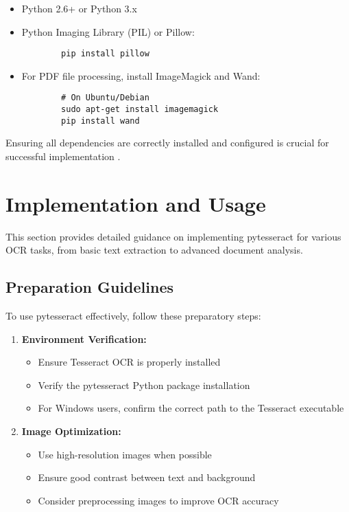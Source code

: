 \begin{itemize}
	\item Python 2.6+ or Python 3.x
	\item Python Imaging Library (PIL) or Pillow:
	\begin{verbatim}
		pip install pillow
	\end{verbatim}
	\item For PDF file processing, install ImageMagick and Wand:
	\begin{verbatim}
		# On Ubuntu/Debian
		sudo apt-get install imagemagick
		pip install wand
	\end{verbatim}
\end{itemize}

Ensuring all dependencies are correctly installed and configured is crucial for successful implementation \cite{Restack:2025}.

\section{Implementation and Usage}
\label{sec:implementation}

This section provides detailed guidance on implementing pytesseract for various OCR tasks, from basic text extraction to advanced document analysis.

\subsection{Preparation Guidelines}
\label{subsec:preparation}

To use pytesseract effectively, follow these preparatory steps:

\begin{enumerate}
	\item \textbf{Environment Verification:}
	\begin{itemize}
		\item Ensure Tesseract OCR is properly installed
		\item Verify the pytesseract Python package installation
		\item For Windows users, confirm the correct path to the Tesseract executable
	\end{itemize}
	
	\item \textbf{Image Optimization:}
	\begin{itemize}
		\item Use high-resolution images when possible
		\item Ensure good contrast between text and background
		\item Consider preprocessing images to improve OCR accuracy
	\end{itemize}
\end{enumerate}

